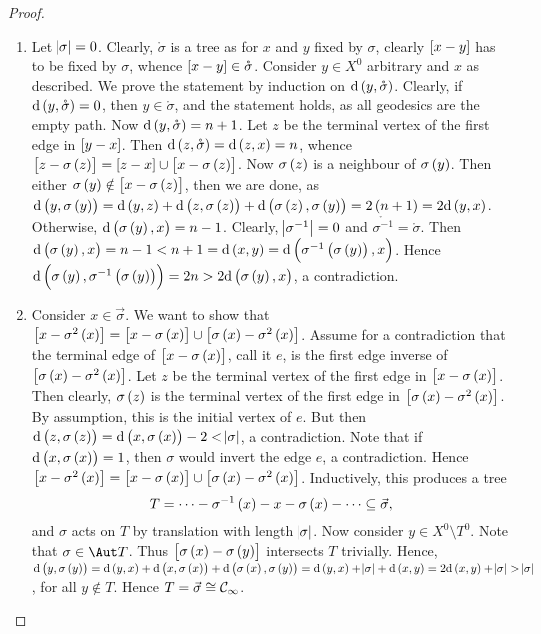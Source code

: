 \begin{proof}
\hfill
\begin{enumerate}
\item Let $ \abs{\sigma} = 0 $. Clearly, $ \mathring{\sigma} $ is a tree as for $ x $ and $ y $ fixed by $ \sigma $, clearly $ \sbr{x - y} $ has to be fixed by $ \sigma $, whence $ \sbr{x - y} \in \mathring{\sigma} $. Consider $ y \in X^0 $ arbitrary and $ x $ as described. We prove the statement by induction on $ \d\br{y, \mathring{\sigma}} $. Clearly, if $ \d\br{y, \mathring{\sigma}} = 0 $, then $ y \in \mathring{\sigma} $, and the statement holds, as all geodesics are the empty path. Now $ \d\br{y, \mathring{\sigma}} = n + 1 $. Let $ z $ be the terminal vertex of the first edge in $ \sbr{y - x} $. Then $ \d\br{z, \mathring{\sigma}} = \d\br{z, x} = n $, whence $ \sbr{z - \sigma\br{z}} = \sbr{z - x} \cup \sbr{x - \sigma\br{z}} $. Now $ \sigma\br{z} $ is a neighbour of $ \sigma\br{y} $. Then either $ \sigma\br{y} \notin \sbr{x - \sigma\br{z}} $, then we are done, as $ \d\br{y, \sigma\br{y}} = \d\br{y, z} + \d\br{z, \sigma\br{z}} + \d\br{\sigma\br{z}, \sigma\br{y}} = 2\br{n + 1} = 2\d\br{y, x} $. Otherwise, $ \d\br{\sigma\br{y}, x} = n - 1 $. Clearly, $ \abs{\sigma^{-1}} = 0 $ and $ \mathring{\sigma^{-1}} = \mathring{\sigma} $. Then $ \d\br{\sigma\br{y}, x} = n - 1 < n + 1 = \d\br{x, y} = \d\br{\sigma^{-1}\br{\sigma\br{y}}, x} $. Hence $ \d\br{\sigma\br{y}, \sigma^{-1}\br{\sigma\br{y}}} = 2n > 2\d\br{\sigma\br{y}, x} $, a contradiction.
\item Consider $ x \in \vec{\sigma} $. We want to show that $ \sbr{x - \sigma^2\br{x}} = \sbr{x - \sigma\br{x}} \cup \sbr{\sigma\br{x} - \sigma^2\br{x}} $. Assume for a contradiction that the terminal edge of $ \sbr{x - \sigma\br{x}} $, call it $ e $, is the first edge inverse of $ \sbr{\sigma\br{x} - \sigma^2\br{x}} $. Let $ z $ be the terminal vertex of the first edge in $ \sbr{x - \sigma\br{x}} $. Then clearly, $ \sigma\br{z} $ is the terminal vertex of the first edge in $ \sbr{\sigma\br{x} - \sigma^2\br{x}} $. By assumption, this is the initial vertex of $ e $. But then $ \d\br{z, \sigma\br{z}} = \d\br{x, \sigma\br{x}} - 2 < \abs{\sigma} $, a contradiction. Note that if $ \d\br{x, \sigma\br{x}} = 1 $, then $ \sigma $ would invert the edge $ e $, a contradiction. Hence $ \sbr{x - \sigma^2\br{x}} = \sbr{x - \sigma\br{x}} \cup \sbr{\sigma\br{x} - \sigma^2\br{x}} $. Inductively, this produces a tree
$$ T = \dots - \sigma^{-1}\br{x} - x - \sigma\br{x} - \dots \subseteq \vec{\sigma}, $$
and $ \sigma $ acts on $ T $ by translation with length $ \abs{\sigma} $. Now consider $ y \in X^0 \setminus T^0 $. Note that $ \sigma \in \Aut T $. Thus $ \sbr{\sigma\br{x} - \sigma\br{y}} $ intersects $ T $ trivially. Hence, $ \d\br{y, \sigma\br{y}} = \d\br{y, x} + \d\br{x, \sigma\br{x}} + \d\br{\sigma\br{x}, \sigma\br{y}} = \d\br{y, x} + \abs{\sigma} + \d\br{x, y} = 2\d\br{x, y} + \abs{\sigma} > \abs{\sigma} $, for all $ y \notin T $. Hence $ T = \vec{\sigma} \cong \mathcal{C}_\infty $.
\end{enumerate}
\end{proof}

